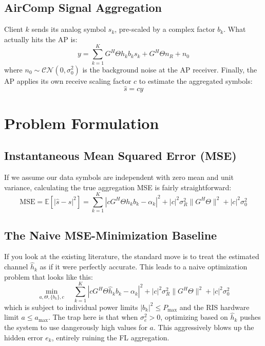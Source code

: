 \documentclass[lettersize,journal]{IEEEtran}
\begin{document}
\subsection{AirComp Signal Aggregation}
Client $k$ sends its analog symbol $s_k$, pre-scaled by a complex factor $b_k$. What actually hits the AP is:
\begin{equation}
y = \sum_{k=1}^K G^H \Theta h_k b_k s_k + G^H \Theta n_R + n_0
\end{equation}
where $n_0 \sim \mathcal{CN}(0, \sigma_0^2)$ is the background noise at the AP receiver. Finally, the AP applies its own receive scaling factor $c$ to estimate the aggregated symbols:
\begin{equation}
\hat{s} = c y
\end{equation}

\section{Problem Formulation}

\subsection{Instantaneous Mean Squared Error (MSE)}
If we assume our data symbols are independent with zero mean and unit variance, calculating the true aggregation MSE is fairly straightforward:
\begin{equation}
\text{MSE} = \mathbb{E}[|\hat{s} - s|^2] = \sum_{k=1}^K |c G^H \Theta h_k b_k - \alpha_k|^2 + |c|^2 \sigma_R^2 \|G^H \Theta\|^2 + |c|^2 \sigma_0^2
\end{equation}

\subsection{The Naive MSE-Minimization Baseline}
If you look at the existing literature, the standard move is to treat the estimated channel $\hat{h}_k$ as if it were perfectly accurate. This leads to a naive optimization problem that looks like this:
\begin{equation}
\min_{a, \Theta, \{b_k\}, c} \quad \sum_{k=1}^K |c G^H \Theta \hat{h}_k b_k - \alpha_k|^2 + |c|^2 \sigma_R^2 \|G^H \Theta\|^2 + |c|^2 \sigma_0^2
\end{equation}
which is subject to individual power limits $|b_k|^2 \le P_{\max}$ and the RIS hardware limit $a \le a_{\max}$. The trap here is that when $\sigma_e^2 > 0$, optimizing based on $\hat{h}_k$ pushes the system to use dangerously high values for $a$. This aggressively blows up the hidden error $e_k$, entirely ruining the FL aggregation.
\end{document}
